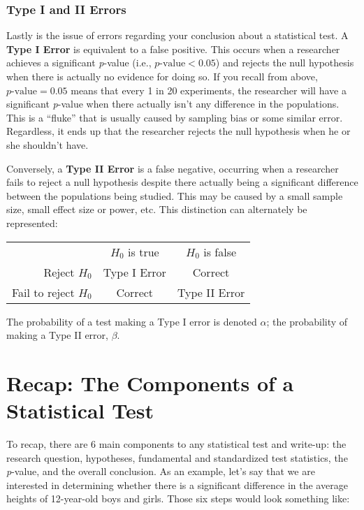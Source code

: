 \subsubsection{Type I and II Errors}
Lastly is the issue of errors regarding your conclusion about a statistical test. A \textbf{Type I Error} is equivalent to a false positive. This occurs when a researcher achieves a significant \textit{p}-value (i.e., $p\text{-value}<0.05$) and rejects the null hypothesis when there is actually no evidence for doing so. If you recall from above, $p\text{-value}=0.05$ means that every 1 in 20 experiments, the researcher will have a significant \textit{p}-value when there actually isn't any difference in the populations. This is a ``fluke'' that is usually caused by sampling bias or some similar error. Regardless, it ends up that the researcher rejects the null hypothesis when he or she shouldn't have.

Conversely, a \textbf{Type II Error} is a false negative, occurring when a researcher fails to reject a null hypothesis despite there actually being a significant difference between the populations being studied. This may be caused by a small sample size, small effect size or power, etc. This distinction can alternately be represented:

\begin{center}
\begin{tabular}{|r c c|}
\hline
& $H_0$ is true & $H_0$ is false \\
 Reject $H_0$ & Type I Error & Correct\\
Fail to reject $H_0$ & Correct & Type II Error\\
\hline
\end{tabular}
\end{center}

The probability of a test making a Type I error is denoted $\alpha$; the probability of making a Type II error, $\beta$.

\section{Recap: The Components of a Statistical Test}

To recap, there are 6 main components to any statistical test and write-up: the research question, hypotheses, fundamental and standardized test statistics, the \textit{p}-value, and the overall conclusion. As an example, let's say that we are interested in determining whether there is a significant difference in the average heights of 12-year-old boys and girls. Those six steps would look something like:

